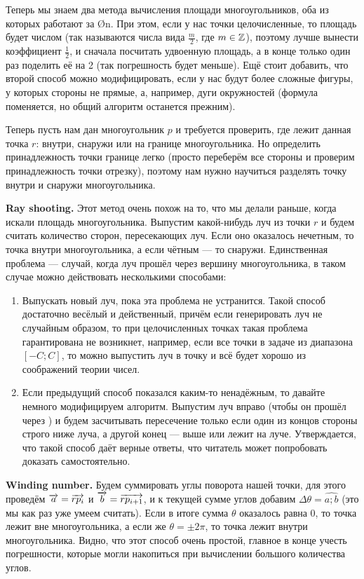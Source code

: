 Теперь мы знаем два метода вычисления площади многоугольников, оба из которых работают за \O{n}. При этом, если у нас точки целочисленные, то площадь будет  числом (так называются числа вида $\frac{m}{2}$, где $m \in \mathbb{Z}$), поэтому лучше вынести коэффициент $\frac{1}{2}$, и сначала посчитать удвоенную площадь, а в конце только один раз поделить её на 2 (так погрешность будет меньше). Ещё стоит добавить, что второй способ можно модифицировать, если у нас будут более сложные фигуры, у которых стороны не прямые, а, например, дуги окружностей (формула поменяется, но общий алгоритм останется прежним).


Теперь пусть нам дан многоугольник $p$ и требуется проверить, где лежит данная точка $r$: внутри, снаружи или на границе многоугольника. Но определить принадлежность точки границе легко (просто переберём все стороны и проверим принадлежность точки отрезку), поэтому нам нужно научиться разделять точку внутри и снаружи многоугольника.

\textbf{Ray shooting.} Этот метод очень похож на то, что мы делали раньше, когда искали площадь многоугольника. Выпустим какой-нибудь луч из точки $r$ и будем считать количество сторон, пересекающих луч. Если оно оказалось нечетным, то точка внутри многоугольника, а если чётным — то снаружи. Единственная проблема — случай, когда луч прошёл через вершину многоугольника, в таком случае можно действовать несколькими способами:

\begin{enumerate}
    \item Выпускать новый луч, пока эта проблема не устранится. Такой способ достаточно весёлый и действенный, причём если генерировать луч не случайным образом, то при целочисленных точках такая проблема гарантирована не возникнет, например, если все точки в задаче из диапазона $[-C; C]$, то можно выпустить луч в точку  и всё будет хорошо из соображений теории чисел.
    \item Если предыдущий способ показался каким-то ненадёжным, то давайте немного модифицируем алгоритм. Выпустим луч вправо (чтобы он прошёл через ) и будем засчитывать пересечение только если один из концов стороны строго ниже луча, а другой конец — выше или лежит на луче. Утверждается, что такой способ даёт верные ответы, что читатель может попробовать доказать самостоятельно.
\end{enumerate}

\textbf{Winding number.} Будем суммировать углы поворота нашей точки, для этого проведём $\overrightarrow{a} = \overrightarrow{rp_i}$ и $\overrightarrow{b} = \overrightarrow{rp_{i + 1}}$, и к текущей сумме углов добавим $\Delta \theta = \widehat{a;b}$ (это мы как раз уже умеем считать). Если в итоге сумма $\theta$ оказалось равна 0, то точка лежит вне многоугольника, а если же $\theta = \pm 2\pi$, то точка лежит внутри многоугольника. Видно, что этот способ очень простой, главное в конце учесть погрешности, которые могли накопиться при вычислении большого количества углов.

